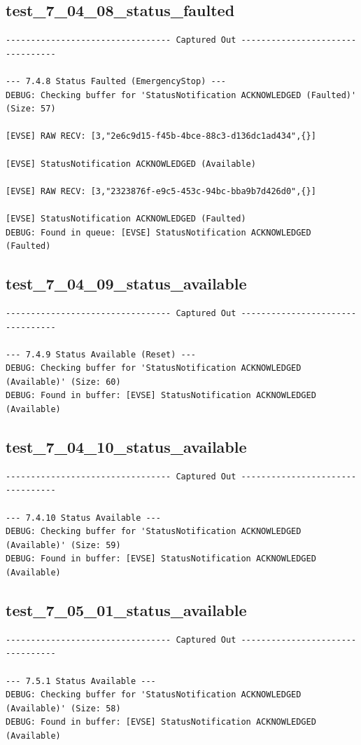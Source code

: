 \documentclass{article}
\begin{document}
\subsection*{test\_7\_04\_08\_status\_faulted}
\begin{lstlisting}
--------------------------------- Captured Out ---------------------------------

--- 7.4.8 Status Faulted (EmergencyStop) ---
DEBUG: Checking buffer for 'StatusNotification ACKNOWLEDGED (Faulted)' (Size: 57)

[EVSE] RAW RECV: [3,"2e6c9d15-f45b-4bce-88c3-d136dc1ad434",{}]

[EVSE] StatusNotification ACKNOWLEDGED (Available)

[EVSE] RAW RECV: [3,"2323876f-e9c5-453c-94bc-bba9b7d426d0",{}]

[EVSE] StatusNotification ACKNOWLEDGED (Faulted)
DEBUG: Found in queue: [EVSE] StatusNotification ACKNOWLEDGED (Faulted)
\end{lstlisting}
\subsection*{test\_7\_04\_09\_status\_available}
\begin{lstlisting}
--------------------------------- Captured Out ---------------------------------

--- 7.4.9 Status Available (Reset) ---
DEBUG: Checking buffer for 'StatusNotification ACKNOWLEDGED (Available)' (Size: 60)
DEBUG: Found in buffer: [EVSE] StatusNotification ACKNOWLEDGED (Available)
\end{lstlisting}
\subsection*{test\_7\_04\_10\_status\_available}
\begin{lstlisting}
--------------------------------- Captured Out ---------------------------------

--- 7.4.10 Status Available ---
DEBUG: Checking buffer for 'StatusNotification ACKNOWLEDGED (Available)' (Size: 59)
DEBUG: Found in buffer: [EVSE] StatusNotification ACKNOWLEDGED (Available)
\end{lstlisting}
\subsection*{test\_7\_05\_01\_status\_available}
\begin{lstlisting}
--------------------------------- Captured Out ---------------------------------

--- 7.5.1 Status Available ---
DEBUG: Checking buffer for 'StatusNotification ACKNOWLEDGED (Available)' (Size: 58)
DEBUG: Found in buffer: [EVSE] StatusNotification ACKNOWLEDGED (Available)
\end{lstlisting}
\end{document}
